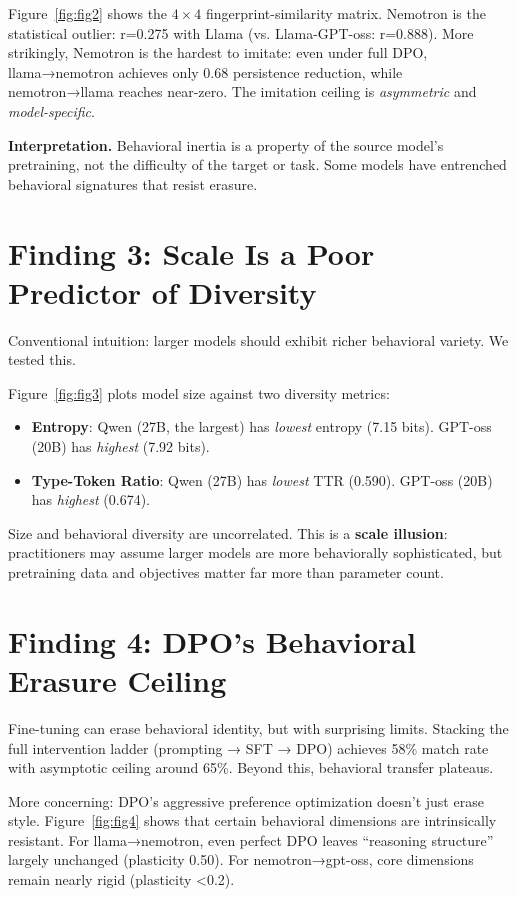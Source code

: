 \documentclass[11pt]{article}
\begin{document}
Figure~\ref{fig:fig2} shows the $4 \times 4$ fingerprint-similarity matrix. Nemotron is the statistical outlier: r=0.275 with Llama (vs. Llama-GPT-oss: r=0.888). More strikingly, Nemotron is the hardest to imitate: even under full DPO, llama→nemotron achieves only 0.68 persistence reduction, while nemotron→llama reaches near-zero. The imitation ceiling is \textit{asymmetric} and \textit{model-specific}.

\textbf{Interpretation.} Behavioral inertia is a property of the source model's pretraining, not the difficulty of the target or task. Some models have entrenched behavioral signatures that resist erasure.

\section{Finding 3: Scale Is a Poor Predictor of Diversity}

Conventional intuition: larger models should exhibit richer behavioral variety. We tested this.

Figure~\ref{fig:fig3} plots model size against two diversity metrics:
\begin{itemize}
  \item \textbf{Entropy}: Qwen (27B, the largest) has \textit{lowest} entropy (7.15 bits). GPT-oss (20B) has \textit{highest} (7.92 bits).
  \item \textbf{Type-Token Ratio}: Qwen (27B) has \textit{lowest} TTR (0.590). GPT-oss (20B) has \textit{highest} (0.674).
\end{itemize}

Size and behavioral diversity are uncorrelated. This is a \textbf{scale illusion}: practitioners may assume larger models are more behaviorally sophisticated, but pretraining data and objectives matter far more than parameter count.

\section{Finding 4: DPO's Behavioral Erasure Ceiling}

Fine-tuning can erase behavioral identity, but with surprising limits. Stacking the full intervention ladder (prompting → SFT → DPO) achieves 58\% match rate with asymptotic ceiling around 65\%. Beyond this, behavioral transfer plateaus.

More concerning: DPO's aggressive preference optimization doesn't just erase style. Figure~\ref{fig:fig4} shows that certain behavioral dimensions are intrinsically resistant. For llama→nemotron, even perfect DPO leaves ``reasoning structure'' largely unchanged (plasticity 0.50). For nemotron→gpt-oss, core dimensions remain nearly rigid (plasticity <0.2).
\end{document}
